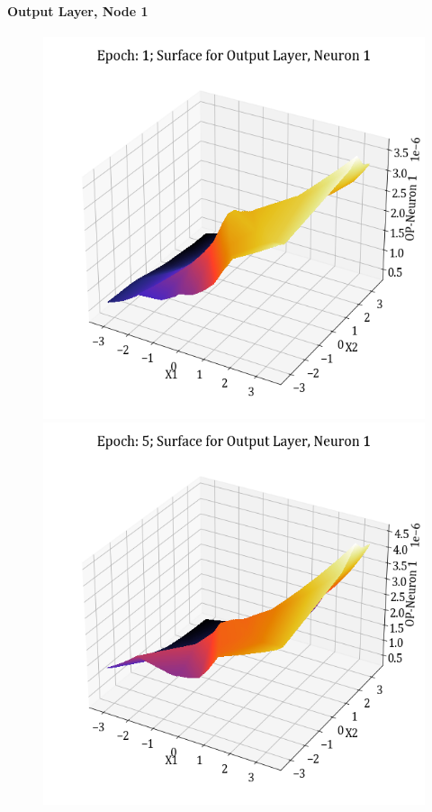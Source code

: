 \documentclass[11pt,a4paper]{article}
\begin{document}
\paragraph{Output Layer, Node 1}
\begin{figure}[H]
    \centering
    \includegraphics[scale=0.4]{images/1B_MLFFNN_E1_OP_N1.png}
    \includegraphics[scale=0.4]{images/1B_MLFFNN_E5_OP_N1.png}

\end{figure}
\end{document}
